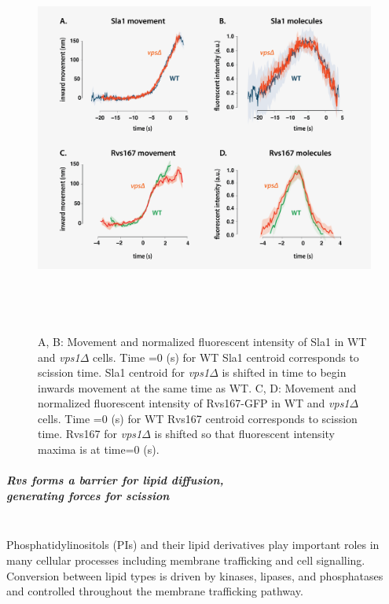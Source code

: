 	\begin{figure}[H]
	\centering
	\includegraphics[width=13cm,height=13cm,keepaspectratio]{figures/results_final/vps2}
	\caption[Tracking endocytic proteins in \textit{vps1$\Delta$} cells]
	{A, B: Movement and normalized fluorescent intensity of Sla1 in WT and \textit{vps1$\Delta$} cells. Time =0 (s) for WT Sla1 centroid corresponds to scission time. Sla1 centroid for \textit{vps1$\Delta$} is shifted in time to begin inwards movement at the same time as WT. 
		C, D: Movement and normalized fluorescent intensity of Rvs167-GFP in WT and  \textit{vps1$\Delta$} cells. Time =0 (s) for WT Rvs167 centroid corresponds to scission time. Rvs167 for \textit{vps1$\Delta$} is shifted so that fluorescent intensity maxima is at time=0 (s).
		\label{fig4_vpsdel2}}
\end{figure}



\newpage
	\subparagraph{ Rvs forms a barrier for lipid diffusion, \\
		generating forces for scission}
	\mbox{}\\
	\vspace{5mm}
	Phosphatidylinositols (PIs) and their lipid derivatives play important roles in many cellular processes including membrane trafficking and cell signalling. Conversion between lipid types is driven by kinases, lipases, and phosphatases and controlled throughout the membrane trafficking pathway. 

